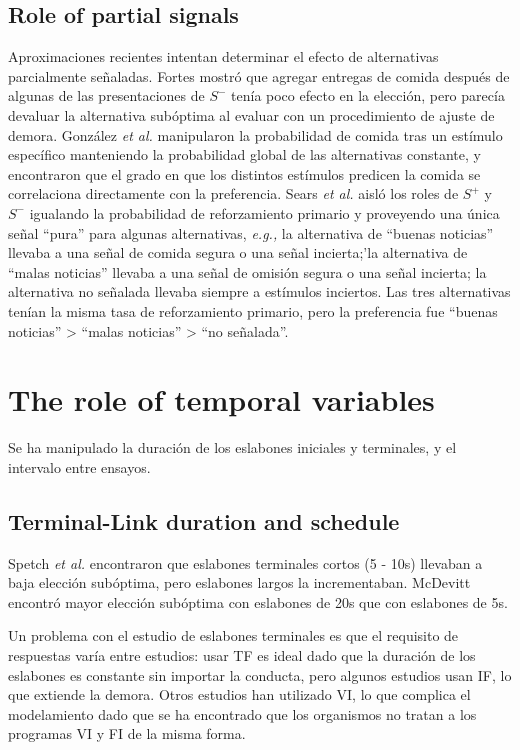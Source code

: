 \documentclass[a4paper,12pt]{article}
\begin{document}
\subsection{Role of partial signals}

Aproximaciones recientes intentan determinar el efecto de alternativas parcialmente señaladas.
Fortes mostró que agregar entregas de comida después de algunas de las presentaciones de $S^{-}$ tenía poco efecto en la elección, pero parecía devaluar la alternativa subóptima al evaluar con un procedimiento de ajuste de demora.
González {\itshape et al.} manipularon la probabilidad de comida tras un estímulo específico manteniendo la probabilidad global de las alternativas constante, y encontraron que el grado en que los distintos estímulos predicen la comida se correlaciona directamente con la preferencia.
Sears {\itshape et al.} aisló los roles de $S^{+}$ y $S^{-}$ igualando la probabilidad de reforzamiento primario y proveyendo una única señal ``pura'' para algunas alternativas, {\itshape e.g.,} la alternativa de ``buenas noticias'' llevaba a una señal de comida segura o una señal incierta;'la alternativa de ``malas noticias'' llevaba a una señal de omisión segura o una señal incierta; la alternativa no señalada llevaba siempre a estímulos inciertos.
Las tres alternativas tenían la misma tasa de reforzamiento primario, pero la preferencia fue ``buenas noticias'' > ``malas noticias'' > ``no señalada''.

\section{The role of temporal variables}

Se ha manipulado la duración de los eslabones iniciales y terminales, y el intervalo entre ensayos.

\subsection{Terminal-Link duration and schedule}

Spetch {\itshape et al.} encontraron que eslabones terminales cortos (5 - 10s) llevaban a baja elección subóptima, pero eslabones largos la incrementaban.
McDevitt encontró mayor elección subóptima con eslabones de 20s que con eslabones de 5s.

Un problema con el estudio de eslabones terminales es que el requisito de respuestas varía entre estudios: usar TF es ideal dado que la duración de los eslabones es constante sin importar la conducta, pero algunos estudios usan IF, lo que extiende la demora.
Otros estudios han utilizado VI, lo que complica el modelamiento dado que se ha encontrado que los organismos no tratan a los programas VI y FI de la misma forma.
\end{document}
